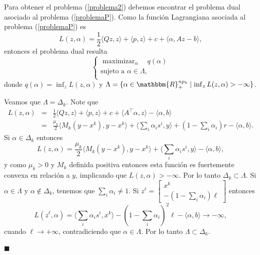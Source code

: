 \documentclass[a4paper,12pt]{report}
\newcommand{\la}{\langle}
\newcommand{\ra}{\rangle}
\newcommand{\RR}{\mathbbm{R}}
\newcommand{\arr}{\rightarrow}
\newenvironment{dem}{\vspace*{-0.1cm}{\it Demostraci\'on:}}{\hfill
$\blacksquare$\\}
\begin{document}
\begin{dem}
Para obtener el problema (\ref{problema2}) debemos encontrar el problema dual asociado al problema (\ref{problemaP}). Como la funci\'on Lagrangiana asociada al problema (\ref{problemaP}) es $$L(z,\alpha)=\frac{1}{2}\la Qz,z\ra+\la p,z\ra +c+\la \alpha,Az-b\ra,$$ entonces el problema dual resulta
\begin{equation}
\left\{
 \begin{array}{rl}
 \displaystyle{\mathop{\mathrm{maximizar}}_{\alpha}}\quad q(\alpha)\\
  \mbox{sujeto a }\alpha\in\Lambda,\\
 \end{array}
\right.
\end{equation}
donde $q(\alpha)=\inf_{z}L(z,\alpha)$ y $\Lambda=\{\alpha\in\RR^{np_k}_+\mid \inf_{z}L(z,\alpha)>-\infty\}$.

Veamos que $\Lambda=\Delta_k$. Note que
\begin{eqnarray*}
 L(z,\alpha)&=&\frac{1}{2}\la Qz,z\ra+\la p,z\ra +c+\la A^\top\alpha,z\ra -\la\alpha,b\ra\\
&=&\frac{\mu_k}{2}\la M_k (y-x^k),y-x^k\ra+{\textstyle\la\sum_{i}\alpha_i s^i,y \ra+ (1-\sum_{i}\alpha_i)r}  -\la\alpha,b\ra.
\end{eqnarray*}
Si $\alpha\in\Delta_k$ entonces 
\begin{equation}\label{aux1_Lem_bundle}
L(z,\alpha)=\frac{\mu_k}{2}\la M_k (y-x^k),y-x^k\ra+{\textstyle\la\sum_{i}\alpha_i s^i,y \ra} -\la\alpha,b\ra, 
\end{equation}
y como $\mu_k>0$ y $M_k$ definida positiva entonces esta funci\'on es fuertemente convexa en relaci\'on a $y$, implicando que $L(z,\alpha)>-\infty$. Por lo tanto $\Delta_k\subset\Lambda$.
Si $\alpha\in\Lambda$ y $\alpha\notin\Delta_k$, tenemos que $\sum_{i}\alpha_i\neq 1$. Si $z^\ell=\left[\begin{array}{c}x^k\\ -(1-\sum_i\alpha_i)\ell\end{array}\right]$ entonces 
$$L(z^\ell,\alpha)={\textstyle\la\sum_{i}\alpha_i s^i,x^k \ra- (1-\sum_{i}\alpha_i)^2\ell} -\la\alpha,b\ra \arr-\infty,$$
 cuando $\ell\arr+\infty$, contradiciendo que $\alpha\in\Lambda$. Por lo tanto $\Lambda\subset\Delta_k$.


\end{dem}
\end{document}
